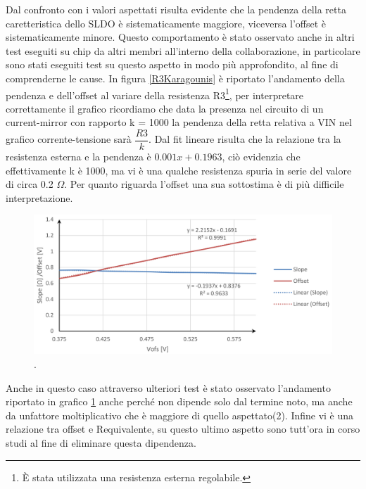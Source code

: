 Dal confronto con i valori aspettati risulta evidente che la pendenza della retta caretteristica dello SLDO è sistematicamente maggiore, viceversa l'offset è sistematicamente minore. 
Questo comportamento è stato osservato anche in altri test eseguiti su chip da altri membri all'interno della collaborazione, in particolare sono stati eseguiti test su questo aspetto in modo più approfondito, al fine di comprenderne le cause. 
In figura \ref{R3Karagounis} è riportato l'andamento della pendenza e dell'offset al variare della resistenza R3\footnote{\`E stata utilizzata una resistenza esterna regolabile.}, per interpretare correttamente il grafico ricordiamo che data la presenza nel circuito di un current-mirror con rapporto k = 1000 la pendenza della retta relativa a VIN nel grafico corrente-tensione sarà $\dfrac{R3}{k}$. 
Dal fit lineare risulta che la relazione tra la resistenza esterna e la pendenza è $0.001x + 0.1963$, ciò evidenzia che effettivamente k è 1000, ma vi è una qualche resistenza spuria in serie del valore di circa 0.2 $\Omega$. 
Per quanto riguarda l'offset una sua sottostima è di più difficile interpretazione. 
\begin{figure}
\centering
\includegraphics[width=\textwidth]{Immagini/OffsetKaragounis}
\caption{ .}%
\label{OffsetKaragounis}
\end{figure}
Anche in questo caso attraverso ulteriori test è stato osservato l'andamento riportato in grafico \ref{OffsetKaragounis} anche perché non dipende solo dal termine noto, ma anche da unfattore moltiplicativo che è maggiore di quello aspettato(2). 
Infine vi è una relazione tra offset e Requivalente, su questo ultimo aspetto sono tutt'ora in corso studi al fine di eliminare questa dipendenza.







